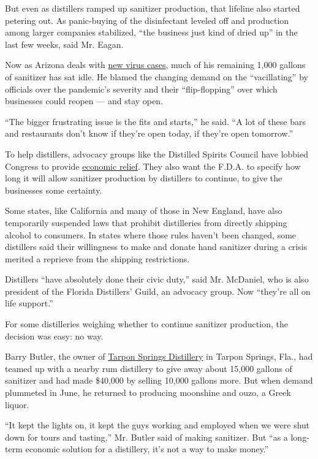 But even as distillers ramped up sanitizer production, that lifeline
also started petering out. As panic-buying of the disinfectant leveled
off and production among larger companies stabilized, ``the business
just kind of dried up'' in the last few weeks, said Mr. Eagan.

Now as Arizona deals with
\href{https://www.nytimes.com/interactive/2020/07/09/us/coronavirus-cases-reopening-trends.html}{new
virus cases}, much of his remaining 1,000 gallons of sanitizer has sat
idle. He blamed the changing demand on the ``vacillating'' by officials
over the pandemic's severity and their ``flip-flopping'' over which
businesses could reopen --- and stay open.

``The bigger frustrating issue is the fits and starts,'' he said. ``A
lot of these bars and restaurants don't know if they're open today, if
they're open tomorrow.''

To help distillers, advocacy groups like the Distilled Spirits Council
have lobbied Congress to provide
\href{https://www.ttb.gov/alcohol/craft-beverage-modernization-and-tax-reform-cbmtra}{economic
relief}. They also want the F.D.A. to specify how long it will allow
sanitizer production by distillers to continue, to give the businesses
some certainty.

Some states, like California and many of those in New England, have also
temporarily suspended laws that prohibit distilleries from directly
shipping alcohol to consumers. In states where those rules haven't been
changed, some distillers said their willingness to make and donate hand
sanitizer during a crisis merited a reprieve from the shipping
restrictions.

Distillers ``have absolutely done their civic duty,'' said Mr. McDaniel,
who is also president of the Florida Distillers' Guild, an advocacy
group. Now ``they're all on life support.''

For some distilleries weighing whether to continue sanitizer production,
the decision was easy: no way.

Barry Butler, the owner of
\href{https://www.tarponspringsdistillery.net/}{Tarpon Springs
Distillery} in Tarpon Springs, Fla., had teamed up with a nearby rum
distillery to give away about 15,000 gallons of sanitizer and had made
\$40,000 by selling 10,000 gallons more. But when demand plummeted in
June, he returned to producing moonshine and ouzo, a Greek liquor.

``It kept the lights on, it kept the guys working and employed when we
were shut down for tours and tasting,'' Mr. Butler said of making
sanitizer. But ``as a long-term economic solution for a distillery, it's
not a way to make money.''

